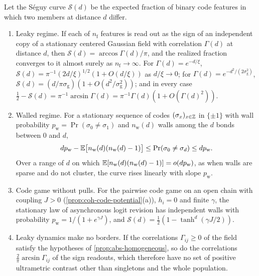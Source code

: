 \begin{proposition}\label{prop:abs-seguy}
Let the S\'eguy curve $\mathcal S(d)$ be the expected fraction of binary code features in which two members at distance $d$ differ.
\begin{enumerate}
\item[(a)] Leaky regime. If each of $n_{\mathrm f}$ features is read out as the sign of an independent copy of a stationary centered Gaussian field with correlation $\Gamma(d)$ at distance $d$, then $\mathcal S(d)=\arccos\Gamma(d)/\pi$, and the realized fraction converges to it almost surely as $n_{\mathrm f}\to\infty$. For $\Gamma(d)=e^{-d/\xi}$, $\mathcal S(d)=\pi^{-1}(2d/\xi)^{1/2}(1+O(d/\xi))$ as $d/\xi\to0$; for $\Gamma(d)=e^{-d^2/(2\sigma_{\mathrm g}^2)}$, $\mathcal S(d)=(d/\pi\sigma_{\mathrm g})(1+O(d^2/\sigma_{\mathrm g}^2))$; and in every case $\frac12-\mathcal S(d)=\pi^{-1}\arcsin\Gamma(d)=\pi^{-1}\Gamma(d)(1+O(\Gamma(d)^2))$.
\item[(b)] Walled regime. For a stationary sequence of codes $(\sigma_x)_{x\in\mathbb{Z}}$ in $\{\pm1\}$ with wall probability $p_{\mathrm w}=\Pr(\sigma_0\ne\sigma_1)$ and $n_{\mathrm w}(d)$ walls among the $d$ bonds between $0$ and $d$,
\[
dp_{\mathrm w}-\mathbb{E}\bigl[n_{\mathrm w}(d)(n_{\mathrm w}(d)-1)\bigr]\le\Pr(\sigma_0\ne\sigma_d)\le dp_{\mathrm w}.
\]
Over a range of $d$ on which $\mathbb{E}[n_{\mathrm w}(d)(n_{\mathrm w}(d)-1)]=o(dp_{\mathrm w})$, as when walls are sparse and do not cluster, the curve rises linearly with slope $p_{\mathrm w}$.
\item[(c)] Code game without pulls. For the pairwise code game on an open chain with coupling $J>0$ (\cref{prop:coh-code-potential}(a)), $h_i=0$ and finite $\gamma$, the stationary law of asynchronous logit revision has independent walls with probability $p_{\mathrm w}=1/(1+e^{\gamma J})$, and $\mathcal S(d)=\frac12(1-\tanh^d(\gamma J/2))$.
\item[(d)] Leaky dynamics make no borders. If the correlations $\Gamma_{ij}\ge0$ of the field satisfy the hypotheses of \cref{prop:abs-homogeneous}, so do the correlations $\frac2\pi\arcsin\Gamma_{ij}$ of the sign readouts, which therefore have no set of positive ultrametric contrast other than singletons and the whole population.
\end{enumerate}
\end{proposition}

